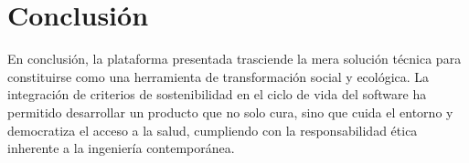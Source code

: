 \section{Conclusión}
En conclusión, la plataforma presentada trasciende la mera solución técnica para constituirse como una herramienta de transformación social y ecológica. La integración de criterios de sostenibilidad en el ciclo de vida del software ha permitido desarrollar un producto que no solo cura, sino que cuida el entorno y democratiza el acceso a la salud, cumpliendo con la responsabilidad ética inherente a la ingeniería contemporánea.